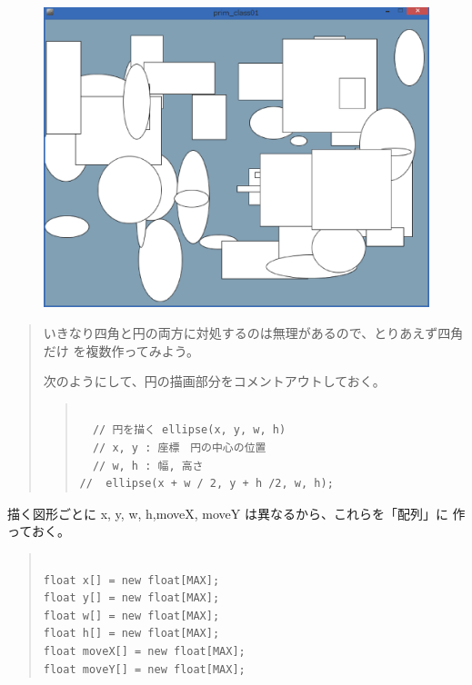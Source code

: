 \documentclass[uplatex,a4j,11pt]{jsarticle}
\renewcommand{\baselinestretch}{1.08}
\begin{document}
\begin{figure}[htbp]
  \begin{center}
   \includegraphics[width=.5\paperwidth]{zu2.eps}
   \caption{}
   \label{070938_20Jul14}
  \end{center}
\end{figure}

\begin{quotation}
 いきなり四角と円の両方に対処するのは無理があるので、とりあえず四角だけ
 を複数作ってみよう。

 次のようにして、円の描画部分をコメントアウトしておく。

    \begin{quote}
	\begin{minipage}{\linewidth}
	 \begin{shadebox}
      \def\baselinestretch{.8}\selectfont
      \small
      \begin{verbatim}

  // 円を描く ellipse(x, y, w, h)
  // x, y : 座標　円の中心の位置
  // w, h : 幅, 高さ
//  ellipse(x + w / 2, y + h /2, w, h);
      \end{verbatim}
	 \end{shadebox} 
	 \end{minipage}
	\end{quote}
\end{quotation}

描く図形ごとに x, y, w, h,moveX, moveY は異なるから、これらを「配列」に
作っておく。
\label{174855_21Jul14}

    \begin{quote}
	\begin{minipage}{\linewidth}
	 \begin{shadebox}
      \def\baselinestretch{.8}\selectfont
      \small
      \begin{verbatim}

float x[] = new float[MAX];
float y[] = new float[MAX];
float w[] = new float[MAX];
float h[] = new float[MAX];
float moveX[] = new float[MAX];
float moveY[] = new float[MAX];
      \end{verbatim}
	 \end{shadebox} 
	 \end{minipage}
	\end{quote}
\end{document}
